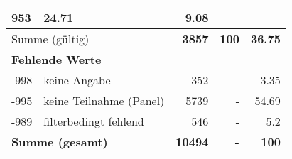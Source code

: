 \begin{longtable}{lXrrr}
       \num{953} &
       \num[round-mode=places,round-precision=2]{24.71} &
         \num[round-mode=places,round-precision=2]{9.08} \\
     \midrule
     \multicolumn{2}{l}{Summe (gültig)} &
       \textbf{\num{3857}} &
     \textbf{\num{100}} &
       \textbf{\num[round-mode=places,round-precision=2]{36.75}} \\
     \multicolumn{5}{l}{\textbf{Fehlende Werte}}\\
       -998 &
       keine Angabe &
         \num{352} &
        - &
         \num[round-mode=places,round-precision=2]{3.35} \\
       -995 &
       keine Teilnahme (Panel) &
         \num{5739} &
        - &
         \num[round-mode=places,round-precision=2]{54.69} \\
       -989 &
       filterbedingt fehlend &
         \num{546} &
        - &
         \num[round-mode=places,round-precision=2]{5.2} \\
     \midrule
     \multicolumn{2}{l}{\textbf{Summe (gesamt)}} &
          \textbf{\num{10494}} &
        \textbf{-} &
        \textbf{\num{100}} \\
     \bottomrule
     \end{longtable}
     
